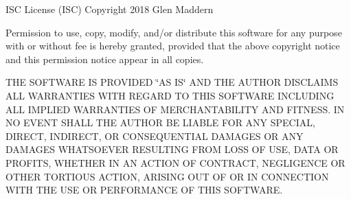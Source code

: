 ISC License (ISC) Copyright 2018 Glen Maddern

Permission to use, copy, modify, and/or distribute this software for any purpose with or without fee is hereby granted, provided that the above copyright notice and this permission notice appear in all copies.

THE SOFTWARE IS PROVIDED \char`\"{}\+AS IS\char`\"{} AND THE AUTHOR DISCLAIMS ALL WARRANTIES WITH REGARD TO THIS SOFTWARE INCLUDING ALL IMPLIED WARRANTIES OF MERCHANTABILITY AND FITNESS. IN NO EVENT SHALL THE AUTHOR BE LIABLE FOR ANY SPECIAL, DIRECT, INDIRECT, OR CONSEQUENTIAL DAMAGES OR ANY DAMAGES WHATSOEVER RESULTING FROM LOSS OF USE, DATA OR PROFITS, WHETHER IN AN ACTION OF CONTRACT, NEGLIGENCE OR OTHER TORTIOUS ACTION, ARISING OUT OF OR IN CONNECTION WITH THE USE OR PERFORMANCE OF THIS SOFTWARE. 